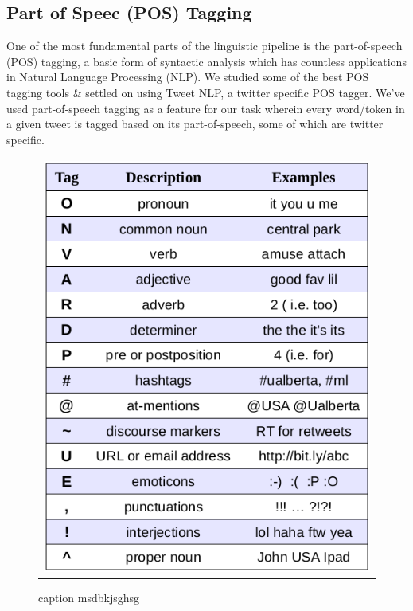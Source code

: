 
\subsection{Part of Speec (POS) Tagging} %
\label{sub:part_of_speec_}

One of the most fundamental parts of the linguistic pipeline is the part-of-speech (POS) tagging, a basic form of syntactic analysis which has countless applications in Natural Language Processing (NLP). We studied some of the best POS tagging tools \& settled on using Tweet NLP, a twitter specific POS tagger. We’ve used part-of-speech tagging as a feature for our task wherein every word/token in a given tweet is tagged based on its part-of-speech, some of which are twitter specific.

\begin{figure}[ht]
\centering 
  \begin{tabular}{@{}l@{}}
    \includegraphics[width=0.4\linewidth]{img/tags-final.png}
  \end{tabular} 
  \caption{caption msdbkjsghsg} 
  \label{fig:tags_final} 
\end{figure}

